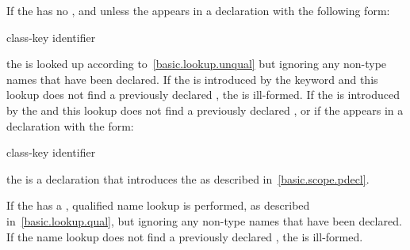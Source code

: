 \pnum
If the  has no
, and unless the
 appears in a declaration with the
following form:
\begin{ncbnf}
class-key  identifier \terminal{;}
\end{ncbnf}
the  is looked up according
to~\ref{basic.lookup.unqual} but ignoring any non-type names that have
been declared. If the  is introduced
by the  keyword and this lookup does not find a previously
declared , the 
is ill-formed. If the  is introduced
by the  and this lookup does not find a previously
declared , or if the
 appears in a declaration with the
form:
\begin{ncbnf}
class-key  identifier \terminal{;}
\end{ncbnf}
the  is a declaration that
introduces the  as described
in~\ref{basic.scope.pdecl}.

\pnum
If the  has a
, qualified name lookup is performed, as
described in~\ref{basic.lookup.qual}, but ignoring any non-type names
that have been declared. If the name lookup does not find a previously
declared , the 
is ill-formed.

